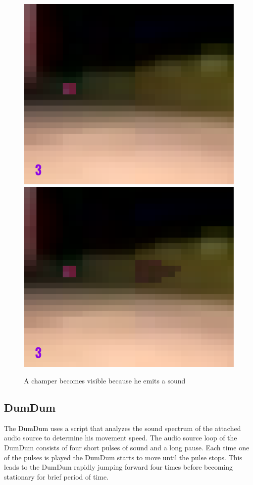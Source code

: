 \begin{figure}[p]
  \centering
  \includegraphics[width=\imgWidth]{images/game_systems/ChamperInvisible.png} \\[\picVdist]
  \includegraphics[width=\imgWidth]{images/game_systems/ChamperVisible.png}
  \caption{A champer becomes visible because he emits a sound}
  \label{Champer}
\end{figure}


\subsection{DumDum}
The DumDum uses a script that analyzes the sound spectrum of the attached audio source to determine his movement speed. The audio source loop of the DumDum consists of four short pulses of sound and a long pause. Each time one of the pulses is played the DumDum starts to move until the pulse stops. This leads to the DumDum rapidly jumping forward four times before becoming stationary for brief period of time.

